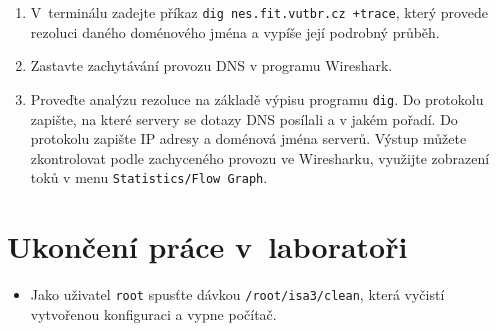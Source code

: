 \documentclass[a4paper,11pt]{article}
\begin{document}
\begin{enumerate}
  \item V~terminálu zadejte příkaz \texttt{dig nes.fit.vutbr.cz +trace}, který provede rezoluci daného doménového jména a vypíše  její podrobný průběh. 
  
  \item Zastavte zachytávání provozu DNS v programu Wireshark.

  \item Proveďte analýzu rezoluce na základě výpisu programu {\tt dig}. Do protokolu zapište, na které servery se dotazy DNS posílali a v jakém pořadí. Do protokolu zapište IP adresy a doménová jména serverů. Výstup můžete zkontrolovat podle zachyceného provozu ve Wiresharku, využijte zobrazení toků v menu {\tt Statistics/Flow Graph}. 

\end{enumerate}

\section{Ukončení práce v~laboratoři}
\begin{itemize}
  \item Jako uživatel {\tt root} spusťte dávkou {\tt /root/isa3/clean}, která vyčistí vytvořenou konfiguraci a vypne počítač.
\end{itemize}
\end{document}
